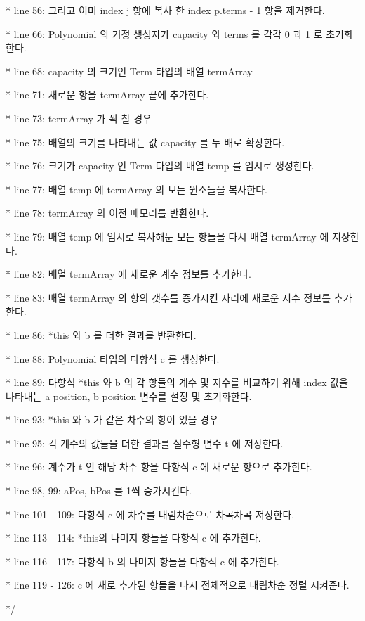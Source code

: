 \documentclass[twoside,twocolumn]{article}
\newenvironment{itemizeReduced}{
\begin{list}{\labelitemi}{\leftmargin=1em}
\setlength{\itemsep}{1pt}
\setlength{\parskip}{0pt}
\setlength{\parsep}{0pt}}{\end{list}
}
\begin{document}
\begin{itemizeReduced}
    \item[*] line 56: 그리고 이미 index j 항에 복사 한 index p.terms - 1 항을 제거한다.
    \item[*] line 66: Polynomial 의 기정 생성자가 capacity 와 terms 를 각각 0 과 1 로 초기화한다.
    \item[*] line 68: capacity 의 크기인 Term 타입의 배열 termArray
    \item[*] line 71: 새로운 항을 termArray 끝에 추가한다.
    \item[*] line 73: termArray 가 꽉 찰 경우
    \item[*] line 75: 배열의 크기를 나타내는 값 capacity 를 두 배로 확장한다.
    \item[*] line 76: 크기가 capacity 인 Term 타입의 배열 temp 를 임시로 생성한다.
    \item[*] line 77: 배열 temp 에 termArray 의 모든 원소들을 복사한다.
    \item[*] line 78: termArray 의 이전 메모리를 반환한다.
    \item[*] line 79: 배열 temp 에 임시로 복사해둔 모든 항들을 다시 배열 termArray 에 저장한다.
    \item[*] line 82: 배열 termArray 에 새로운 계수 정보를 추가한다.
    \item[*] line 83: 배열 termArray 의 항의 갯수를 증가시킨 자리에 새로운 지수 정보를 추가한다.
    \item[*] line 86: *this 와 b 를 더한 결과를 반환한다.
    \item[*] line 88: Polynomial 타입의 다항식 c 를 생성한다.
    \item[*] line 89: 다항식 *this 와 b 의 각 항들의 계수 및 지수를 비교하기 위해 index 값을 나타내는 a position, b position 변수를 설정 및 초기화한다.
    \item[*] line 93: *this 와 b 가 같은 차수의 항이 있을 경우
    \item[*] line 95: 각 계수의 값들을 더한 결과를 실수형 변수 t 에 저장한다.
    \item[*] line 96: 계수가 t 인 해당 차수 항을 다항식 c 에 새로운 항으로 추가한다.
    \item[*] line 98, 99: aPos, bPos 를 1씩 증가시킨다.
    \item[*] line 101 - 109: 다항식 c 에 차수를 내림차순으로 차곡차곡 저장한다.
    \item[*] line 113 - 114: *this의 나머지 항들을 다항식 c 에 추가한다.
    \item[*] line 116 - 117: 다항식 b 의 나머지 항들을 다항식 c 에 추가한다.
    \item[*] line 119 - 126: c 에 새로 추가된 항들을 다시 전체적으로 내림차순 정렬 시켜준다.
\end{itemizeReduced}
*/
\end{document}
